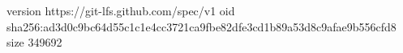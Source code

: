 version https://git-lfs.github.com/spec/v1
oid sha256:ad3d0c9bc64d55c1c1e4cc3721ca9fbe82dfe3cd1b89a53d8c9afae9b556cfd8
size 349692
